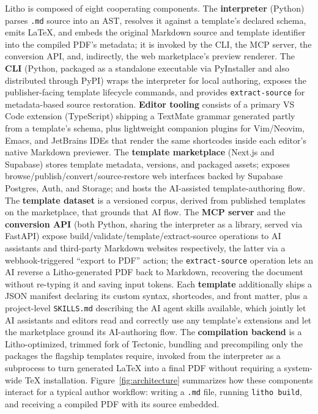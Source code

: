 \documentclass[a4paper,twoside]{article}
\begin{document}
Litho is composed of eight cooperating components. The \textbf{interpreter} (Python) parses \texttt{.md} source into an AST, resolves it against a template's declared schema, emits LaTeX, and embeds the original Markdown source and template identifier into the compiled PDF's metadata; it is invoked by the CLI, the MCP server, the conversion API, and, indirectly, the web marketplace's preview renderer. The \textbf{CLI} (Python, packaged as a standalone executable via PyInstaller and also distributed through PyPI) wraps the interpreter for local authoring, exposes the publisher-facing template lifecycle commands, and provides \texttt{extract-source} for metadata-based source restoration. \textbf{Editor tooling} consists of a primary VS Code extension (TypeScript) shipping a TextMate grammar generated partly from a template's schema, plus lightweight companion plugins for Vim/Neovim, Emacs, and JetBrains IDEs that render the same shortcodes inside each editor's native Markdown previewer. The \textbf{template marketplace} (Next.js and Supabase) stores template metadata, versions, and packaged assets; exposes browse/publish/convert/source-restore web interfaces backed by Supabase Postgres, Auth, and Storage; and hosts the AI-assisted template-authoring flow. The \textbf{template dataset} is a versioned corpus, derived from published templates on the marketplace, that grounds that AI flow. The \textbf{MCP server} and the \textbf{conversion API} (both Python, sharing the interpreter as a library, served via FastAPI) expose build/validate/template/extract-source operations to AI assistants and third-party Markdown websites respectively, the latter via a webhook-triggered ``export to PDF'' action; the \texttt{extract-source} operation lets an AI reverse a Litho-generated PDF back to Markdown, recovering the document without re-typing it and saving input tokens. Each \textbf{template} additionally ships a JSON manifest declaring its custom syntax, shortcodes, and front matter, plus a project-level \texttt{SKILLS.md} describing the AI agent skills available, which jointly let AI assistants and editors read and correctly use any template's extensions and let the marketplace ground its AI-authoring flow. The \textbf{compilation backend} is a Litho-optimized, trimmed fork of Tectonic, bundling and precompiling only the packages the flagship templates require, invoked from the interpreter as a subprocess to turn generated LaTeX into a final PDF without requiring a system-wide TeX installation. Figure~\ref{fig:architecture} summarizes how these components interact for a typical author workflow: writing a \texttt{.md} file, running \texttt{litho build}, and receiving a compiled PDF with its source embedded.
\end{document}
